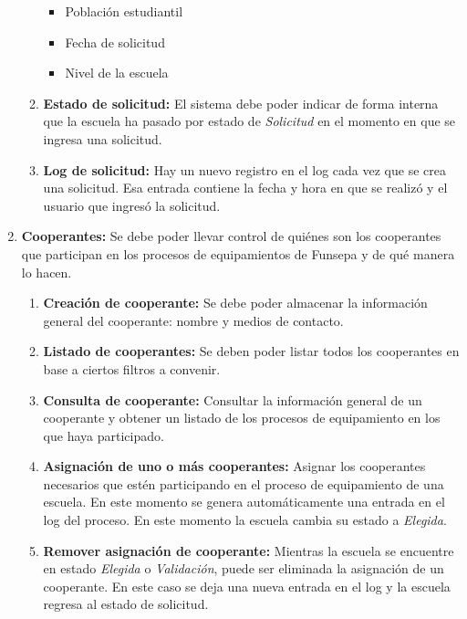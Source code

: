 \documentclass[11pt]{report}
\newcommand{\requisito}[2]{\textbf{#1:} #2}
\begin{document}
\begin{enumerate}[leftmargin=0.8cm]
\begin{enumerate}
{\begin{itemize}
					\item Población estudiantil
					\item Fecha de solicitud
					\item Nivel de la escuela
				\end{itemize}
			}
			\item \requisito{Estado de solicitud}{El sistema debe poder indicar de forma interna que la escuela ha pasado por estado de \textit{Solicitud} en el momento en que se ingresa una solicitud.}
			\item \requisito{Log de solicitud}{Hay un nuevo registro en el log cada vez que se crea una solicitud. Esa entrada contiene la  fecha y hora en que se realizó y el usuario que ingresó la solicitud.}
		\end{enumerate}
		
		\item \requisito{Cooperantes}{Se debe poder llevar control de quiénes son los cooperantes que participan en los procesos de equipamientos de Funsepa y de qué manera lo hacen.}
		\begin{enumerate}
			\item \requisito{Creación de cooperante}{Se debe poder almacenar la información general del cooperante: nombre y medios de contacto.}
			\item \requisito{Listado de cooperantes}{Se deben poder listar todos los cooperantes en base a ciertos filtros a convenir.}
			\item \requisito{Consulta de cooperante}{Consultar la información general de un cooperante y obtener  un listado de los procesos de equipamiento en los que haya participado.}
			\item \requisito{Asignación de uno o más cooperantes}{Asignar los cooperantes necesarios que estén participando en el proceso de equipamiento de una escuela. En este momento se genera automáticamente una entrada en el log del proceso. En este momento la escuela cambia su estado a \textit{Elegida}.}
			\item \requisito{Remover asignación de cooperante}{Mientras la escuela se encuentre en estado \textit{Elegida} o \textit{Validación}, puede ser eliminada la asignación de un cooperante. En este caso se deja una nueva entrada en el log y la escuela regresa al estado de solicitud.}
		\end{enumerate}
		

\end{enumerate}
\end{document}
